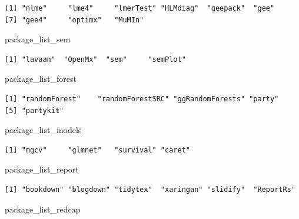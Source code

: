 \documentclass[]{book}
\newenvironment{Shaded}{\begin{snugshade}}{\end{snugshade}}
\newcommand{\NormalTok}[1]{#1}
\theoremstyle{definition}
\theoremstyle{definition}
\theoremstyle{definition}
\theoremstyle{remark}
\begin{document}
\begin{verbatim}
[1] "nlme"     "lme4"     "lmerTest" "HLMdiag"  "geepack"  "gee"     
[7] "gee4"     "optimx"   "MuMIn"   
\end{verbatim}

\begin{Shaded}
\begin{Highlighting}[]
\NormalTok{package_list_sem}
\end{Highlighting}
\end{Shaded}

\begin{verbatim}
[1] "lavaan"  "OpenMx"  "sem"     "semPlot"
\end{verbatim}

\begin{Shaded}
\begin{Highlighting}[]
\NormalTok{package_list_forest}
\end{Highlighting}
\end{Shaded}

\begin{verbatim}
[1] "randomForest"    "randomForestSRC" "ggRandomForests" "party"          
[5] "partykit"       
\end{verbatim}

\begin{Shaded}
\begin{Highlighting}[]
\NormalTok{package_list_models}
\end{Highlighting}
\end{Shaded}

\begin{verbatim}
[1] "mgcv"     "glmnet"   "survival" "caret"   
\end{verbatim}

\begin{Shaded}
\begin{Highlighting}[]
\NormalTok{package_list_report}
\end{Highlighting}
\end{Shaded}

\begin{verbatim}
[1] "bookdown" "blogdown" "tidytex"  "xaringan" "slidify"  "ReportRs"
\end{verbatim}

\begin{Shaded}
\begin{Highlighting}[]
\NormalTok{package_list_redcap}
\end{Highlighting}
\end{Shaded}
\end{document}
